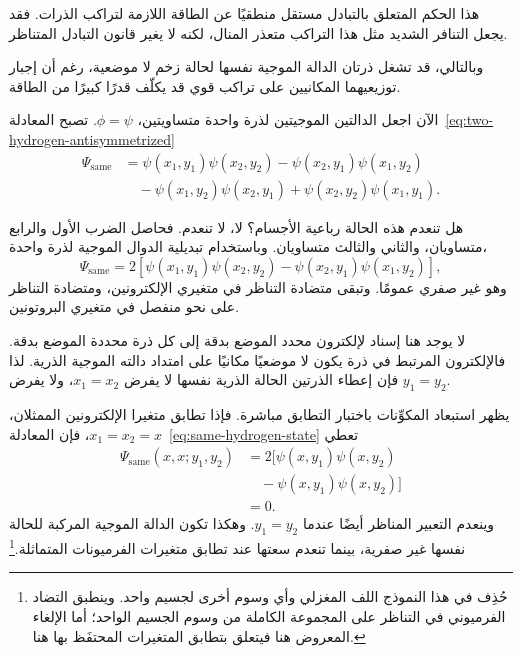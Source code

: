 هذا الحكم المتعلق بالتبادل مستقل منطقيًا عن الطاقة اللازمة لتراكب الذرات. فقد يجعل التنافر الشديد مثل هذا التراكب متعذر المنال، لكنه لا يغير قانون التبادل المتناظر.

\begin{classroomqa}
\end{classroomqa}

وبالتالي، قد تشغل ذرتان الدالة الموجية نفسها لحالة زخم لا موضعية، رغم أن إجبار توزيعيهما المكانيين على تراكب قوي قد يكلّف قدرًا كبيرًا من الطاقة.

الآن اجعل الدالتين الموجيتين لذرة واحدة متساويتين، \(\phi=\psi\). تصبح المعادلة~\eqref{eq:two-hydrogen-antisymmetrized}
\begin{align}
\Psi_{\mathrm{same}}
&=\psi(x_1,y_1)\psi(x_2,y_2)
-\psi(x_2,y_1)\psi(x_1,y_2)\nonumber\\
&\quad
-\psi(x_1,y_2)\psi(x_2,y_1)
+\psi(x_2,y_2)\psi(x_1,y_1).
\end{align}

هل تنعدم هذه الحالة رباعية الأجسام؟ لا، لا تنعدم. فحاصل الضرب الأول والرابع متساويان، والثاني والثالث متساويان. وباستخدام تبديلية الدوال الموجية لذرة واحدة،
\begin{equation}
\Psi_{\mathrm{same}}
=
2\left[
\psi(x_1,y_1)\psi(x_2,y_2)
-\psi(x_2,y_1)\psi(x_1,y_2)
\right],
\label{eq:same-hydrogen-state}
\end{equation}
وهو غير صفري عمومًا. وتبقى متضادة التناظر في متغيري الإلكترونين، ومتضادة التناظر على نحو منفصل في متغيري البروتونين.

لا يوجد هنا إسناد لإلكترون محدد الموضع بدقة إلى كل ذرة محددة الموضع بدقة. فالإلكترون المرتبط في ذرة يكون لا موضعيًا مكانيًا على امتداد دالته الموجية الذرية. لذا فإن إعطاء الذرتين الحالة الذرية نفسها لا يفرض \(x_1=x_2\)، ولا يفرض \(y_1=y_2\).

يظهر استبعاد المكوِّنات باختبار التطابق مباشرة. فإذا تطابق متغيرا الإلكترونين الممثلان، \(x_1=x_2=x\)، فإن المعادلة~\eqref{eq:same-hydrogen-state} تعطي
\begin{align}
\Psi_{\mathrm{same}}(x,x;y_1,y_2)
&=2\bigl[
\psi(x,y_1)\psi(x,y_2)\nonumber\\
&\quad{}-\psi(x,y_1)\psi(x,y_2)
\bigr]\\
&=0.
\end{align}
وينعدم التعبير المناظر أيضًا عندما \(y_1=y_2\). وهكذا تكون الدالة الموجية المركبة للحالة نفسها غير صفرية، بينما تنعدم سعتها عند تطابق متغيرات الفرميونات المتماثلة.\footnote{حُذِف في هذا النموذج اللف المغزلي وأي وسوم أخرى لجسيم واحد. وينطبق التضاد الفرميوني في التناظر على المجموعة الكاملة من وسوم الجسيم الواحد؛ أما الإلغاء المعروض هنا فيتعلق بتطابق المتغيرات المحتفَظ بها هنا.}

